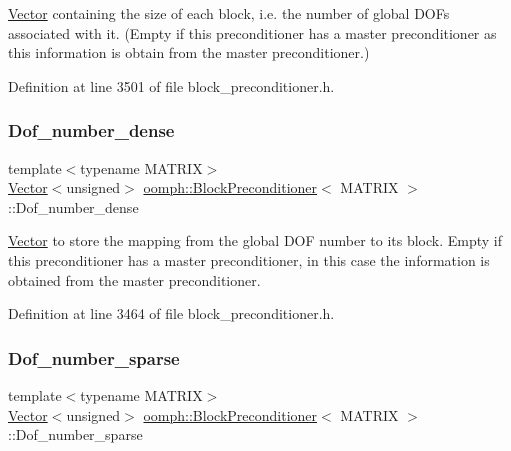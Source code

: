 \hyperlink{classoomph_1_1Vector}{Vector} containing the size of each block, i.\+e. the number of global D\+O\+Fs associated with it. (Empty if this preconditioner has a master preconditioner as this information is obtain from the master preconditioner.) 



Definition at line 3501 of file block\+\_\+preconditioner.\+h.

\mbox{\label{classoomph_1_1BlockPreconditioner_a37b22a0a25030a4b08f2eaec261ae22b}} 
\subsubsection{\texorpdfstring{Dof\+\_\+number\+\_\+dense}{Dof\_number\_dense}}
{\footnotesize\ttfamily template$<$typename M\+A\+T\+R\+IX$>$ \\
\hyperlink{classoomph_1_1Vector}{Vector}$<$unsigned$>$ \hyperlink{classoomph_1_1BlockPreconditioner}{oomph\+::\+Block\+Preconditioner}$<$ M\+A\+T\+R\+IX $>$\+::Dof\+\_\+number\+\_\+dense\hspace{0.3cm}{\ttfamily [private]}}



\hyperlink{classoomph_1_1Vector}{Vector} to store the mapping from the global D\+OF number to its block. Empty if this preconditioner has a master preconditioner, in this case the information is obtained from the master preconditioner. 



Definition at line 3464 of file block\+\_\+preconditioner.\+h.

\mbox{\label{classoomph_1_1BlockPreconditioner_a5a6adc0423ef4d31562d149324c4a679}} 
\subsubsection{\texorpdfstring{Dof\+\_\+number\+\_\+sparse}{Dof\_number\_sparse}}
{\footnotesize\ttfamily template$<$typename M\+A\+T\+R\+IX$>$ \\
\hyperlink{classoomph_1_1Vector}{Vector}$<$unsigned$>$ \hyperlink{classoomph_1_1BlockPreconditioner}{oomph\+::\+Block\+Preconditioner}$<$ M\+A\+T\+R\+IX $>$\+::Dof\+\_\+number\+\_\+sparse\hspace{0.3cm}{\ttfamily [private]}}



